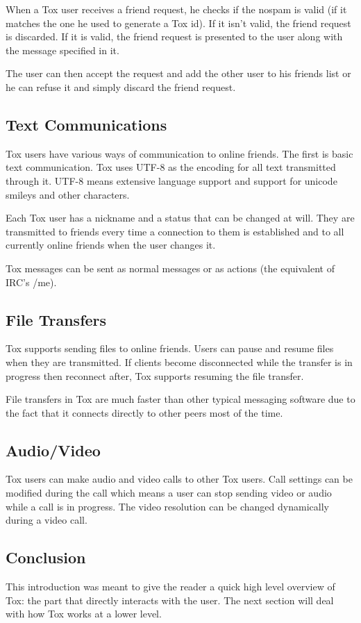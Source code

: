 \documentclass{tox}
\begin{document}
When a Tox user receives a friend request, he checks if the nospam is valid (if 
it matches the one he used to generate a Tox id). If it isn't valid, the friend 
request is discarded. If it is valid, the friend request is presented to the 
user along with the message specified in it.

The user can then accept the request and add the other user to his friends list 
or he can refuse it and simply discard the friend request.

\subsection{Text Communications}

Tox users have various ways of communication to online friends. The first is 
basic text communication. Tox uses UTF-8 as the encoding for all text 
transmitted through it. UTF-8 means extensive language support and support for 
unicode smileys and other characters.

Each Tox user has a nickname and a status that can be changed at will. They are 
transmitted to friends every time a connection to them is established and to 
all currently online friends when the user changes it.

Tox messages can be sent as normal messages or as actions (the equivalent of 
IRC's /me).

\subsection{File Transfers}

Tox supports sending files to online friends. Users can pause and resume files 
when they are transmitted. If clients become disconnected while the transfer is 
in progress then reconnect after, Tox supports resuming the file transfer.

File transfers in Tox are much faster than other typical messaging software due 
to the fact that it connects directly to other peers most of the time.

\subsection{Audio/Video}

Tox users can make audio and video calls to other Tox users. Call settings can 
be modified during the call which means a user can stop sending video or audio 
while a call is in progress. The video resolution can be changed dynamically 
during a video call.

\subsection{Conclusion}

This introduction was meant to give the reader a quick high level overview of 
Tox: the part that directly interacts with the user. The next section will deal 
with how Tox works at a lower level.
\end{document}
